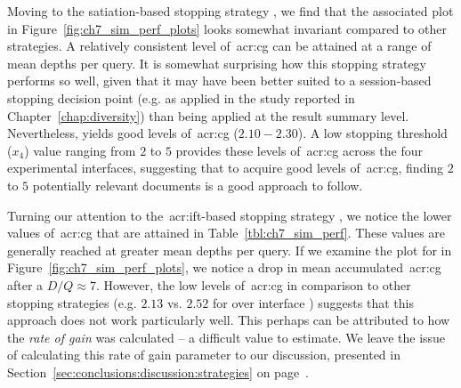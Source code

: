 Moving to the satiation-based stopping strategy , we find that the associated plot in Figure~\ref{fig:ch7_sim_perf_plots} looks somewhat invariant compared to other strategies. A relatively consistent level of~\gls{acr:cg} can be attained at a range of mean depths per query. It is somewhat surprising how this stopping strategy performs so well, given that it may have been better suited to a session-based stopping decision point (e.g. as applied in the study reported in Chapter~\ref{chap:diversity}) than being applied at the result summary level. Nevertheless,  yields good levels of~\gls{acr:cg} ($2.10-2.30$). A low stopping threshold ($x_4$) value ranging from $2$ to $5$ provides these levels of~\gls{acr:cg} across the four experimental interfaces, suggesting that to acquire good levels of~\gls{acr:cg}, finding $2$ to $5$ potentially relevant documents is a good approach to follow.

Turning our attention to the~\gls{acr:ift}-based stopping strategy , we notice the lower values of~\gls{acr:cg} that are attained in Table~\ref{tbl:ch7_sim_perf}. These values are generally reached at greater mean depths per query. If we examine the plot for  in Figure~\ref{fig:ch7_sim_perf_plots}, we notice a drop in mean accumulated~\gls{acr:cg} after a $D/Q\approx7$. However, the low levels of~\gls{acr:cg} in comparison to other stopping strategies (e.g. $2.13$ vs. $2.52$ for  over interface ) suggests that this approach does not work particularly well. This perhaps can be attributed to how the \emph{rate of gain} was calculated -- a difficult value to estimate. We leave the issue of calculating this rate of gain parameter to our discussion, presented in Section~\ref{sec:conclusions:discussion:strategies} on page~\pageref{sec:conclusions:discussion:strategies}.

